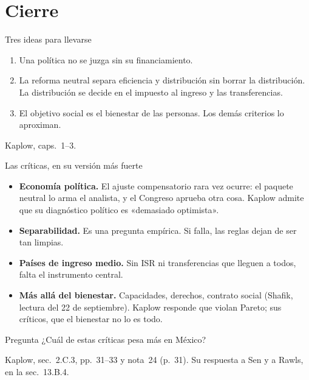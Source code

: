 \documentclass[aspectratio=169,11pt]{beamer}
\newcommand{\fuente}[1]{\par\vfill{\small\color{cGris}#1\par}}
\begin{document}
\section{Cierre}

\begin{frame}{Tres ideas para llevarse}
  \begin{enumerate}
    \item Una política no se juzga sin su financiamiento.
    \pause
    \item La reforma neutral separa eficiencia y distribución sin borrar la distribución. La distribución se decide en el impuesto al ingreso y las transferencias.
    \pause
    \item El objetivo social es el bienestar de las personas. Los demás criterios lo aproximan.
  \end{enumerate}
  \fuente{Kaplow, caps.~1--3.}
\end{frame}

\begin{frame}{Las críticas, en su versión más fuerte}
  \begin{itemize}
    \item \textbf{Economía política.} El ajuste compensatorio rara vez ocurre: el paquete neutral lo arma el analista, y el Congreso aprueba otra cosa. Kaplow admite que su diagnóstico político es «demasiado optimista».
    \pause
    \item \textbf{Separabilidad.} Es una pregunta empírica. Si falla, las reglas dejan de ser tan limpias.
    \pause
    \item \textbf{Países de ingreso medio.} Sin ISR ni transferencias que lleguen a todos, falta el instrumento central.
    \pause
    \item \textbf{Más allá del bienestar.} Capacidades, derechos, contrato social (Shafik, lectura del 22 de septiembre). Kaplow responde que violan Pareto; sus críticos, que el bienestar no lo es todo.
  \end{itemize}
  \pause
  \begin{alertblock}{Pregunta}
    ¿Cuál de estas críticas pesa más en México?
  \end{alertblock}
  \fuente{Kaplow, sec.~2.C.3, pp.~31--33 y nota~24 (p.~31). Su respuesta a Sen y a Rawls, en la sec.~13.B.4.}
\end{frame}
\end{document}
